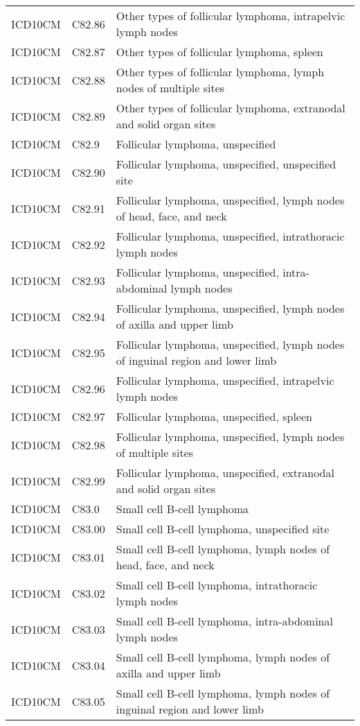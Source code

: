 \begin{longtable}{p{}p{}p{}}
  ICD10CM & C82.86 & Other types of follicular lymphoma, intrapelvic lymph nodes \\ 
  ICD10CM & C82.87 & Other types of follicular lymphoma, spleen \\ 
  ICD10CM & C82.88 & Other types of follicular lymphoma, lymph nodes of multiple sites \\ 
  ICD10CM & C82.89 & Other types of follicular lymphoma, extranodal and solid organ sites \\ 
  ICD10CM & C82.9 & Follicular lymphoma, unspecified \\ 
  ICD10CM & C82.90 & Follicular lymphoma, unspecified, unspecified site \\ 
  ICD10CM & C82.91 & Follicular lymphoma, unspecified, lymph nodes of head, face, and neck \\ 
  ICD10CM & C82.92 & Follicular lymphoma, unspecified, intrathoracic lymph nodes \\ 
  ICD10CM & C82.93 & Follicular lymphoma, unspecified, intra-abdominal lymph nodes \\ 
  ICD10CM & C82.94 & Follicular lymphoma, unspecified, lymph nodes of axilla and upper limb \\ 
  ICD10CM & C82.95 & Follicular lymphoma, unspecified, lymph nodes of inguinal region and lower limb \\ 
  ICD10CM & C82.96 & Follicular lymphoma, unspecified, intrapelvic lymph nodes \\ 
  ICD10CM & C82.97 & Follicular lymphoma, unspecified, spleen \\ 
  ICD10CM & C82.98 & Follicular lymphoma, unspecified, lymph nodes of multiple sites \\ 
  ICD10CM & C82.99 & Follicular lymphoma, unspecified, extranodal and solid organ sites \\ 
  ICD10CM & C83.0 & Small cell B-cell lymphoma \\ 
  ICD10CM & C83.00 & Small cell B-cell lymphoma, unspecified site \\ 
  ICD10CM & C83.01 & Small cell B-cell lymphoma, lymph nodes of head, face, and neck \\ 
  ICD10CM & C83.02 & Small cell B-cell lymphoma, intrathoracic lymph nodes \\ 
  ICD10CM & C83.03 & Small cell B-cell lymphoma, intra-abdominal lymph nodes \\ 
  ICD10CM & C83.04 & Small cell B-cell lymphoma, lymph nodes of axilla and upper limb \\ 
  ICD10CM & C83.05 & Small cell B-cell lymphoma, lymph nodes of inguinal region and lower limb \\ 

\end{longtable}
